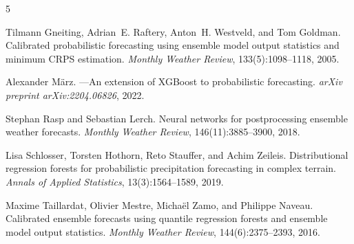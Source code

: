 \documentclass[11pt]{article}
\begin{document}

\begin{thebibliography}{5}

Tilmann Gneiting, Adrian~E. Raftery, Anton~H. Westveld, and Tom Goldman.
\newblock Calibrated probabilistic forecasting using ensemble model output statistics and minimum {CRPS} estimation.
\newblock \emph{Monthly Weather Review}, 133(5):1098--1118, 2005.

Alexander M{\"a}rz.
---An extension of {XGBoost} to probabilistic forecasting.
\newblock \emph{arXiv preprint arXiv:2204.06826}, 2022.

Stephan Rasp and Sebastian Lerch.
\newblock Neural networks for postprocessing ensemble weather forecasts.
\newblock \emph{Monthly Weather Review}, 146(11):3885--3900, 2018.

Lisa Schlosser, Torsten Hothorn, Reto Stauffer, and Achim Zeileis.
\newblock Distributional regression forests for probabilistic precipitation forecasting in complex terrain.
\newblock \emph{Annals of Applied Statistics}, 13(3):1564--1589, 2019.

Maxime Taillardat, Olivier Mestre, Micha{\"e}l Zamo, and Philippe Naveau.
\newblock Calibrated ensemble forecasts using quantile regression forests and ensemble model output statistics.
\newblock \emph{Monthly Weather Review}, 144(6):2375--2393, 2016.

\end{thebibliography}
\end{document}
